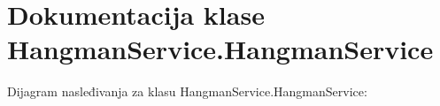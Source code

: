 \hypertarget{classHangmanService_1_1HangmanService}{}\section{Dokumentacija klase Hangman\+Service.\+Hangman\+Service}
\label{classHangmanService_1_1HangmanService}


Dijagram nasleđivanja za klasu Hangman\+Service.\+Hangman\+Service\+:
